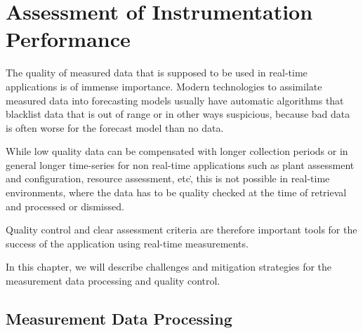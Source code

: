 \chapter{Assessment of Instrumentation Performance }
\label{ch:performanceassessment}
{\color{magenta}{Contributing author: COM, AK }}{\color{blue}{ -- needs attention  }}

\noindent
{}


The quality of measured data that is supposed to be used in real-time applications is of immense importance. Modern technologies to assimilate measured data into forecasting models usually have automatic algorithms that blacklist data that is out of range or in other ways suspicious, because bad data is often worse for the forecast model than no data. 

While low quality data can be compensated with longer collection periods or in general longer time-series for non real-time applications such as plant assessment and configuration, resource assessment, etc\., this is not possible in real-time environments, where the data has to be quality checked at the time of retrieval and processed or dismissed. 

Quality control and clear assessment criteria are therefore important tools for the success of the application using real-time measurements. 

In this chapter, we will describe challenges and mitigation strategies for the measurement data processing and quality control. 



\section{Measurement Data Processing {\color{blue}{needs attention}}}\label{sec:dataqa}



